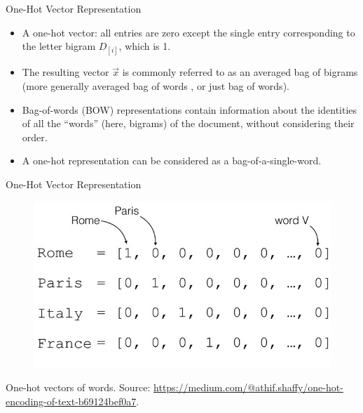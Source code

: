\documentclass[handout]{beamer}
\begin{document}
\begin{frame}{One-Hot Vector Representation}

\begin{scriptsize}
\begin{itemize}
\item A one-hot vector: all entries are zero except the single entry corresponding to the letter bigram $D_{[i]}$, which is 1.
\item The resulting vector $\vec{x}$ is commonly referred to as an averaged bag of bigrams (more generally averaged bag of words , or just bag of words).
\item Bag-of-words (BOW) representations contain information about the identities of all the ``words'' (here, bigrams) of the document, without considering their order.
\item A one-hot representation can be considered as a bag-of-a-single-word.
\end{itemize}
\end{scriptsize}
\end{frame}



\begin{frame}{One-Hot Vector Representation}

\begin{scriptsize}

\begin{figure}[htb]
	\centering
	 \includegraphics[scale=0.35]{pics/onehot.png}
\end{figure}

One-hot vectors of words. Source: \url{https://medium.com/@athif.shaffy/one-hot-encoding-of-text-b69124bef0a7}.

\end{scriptsize}
\end{frame}
\end{document}
